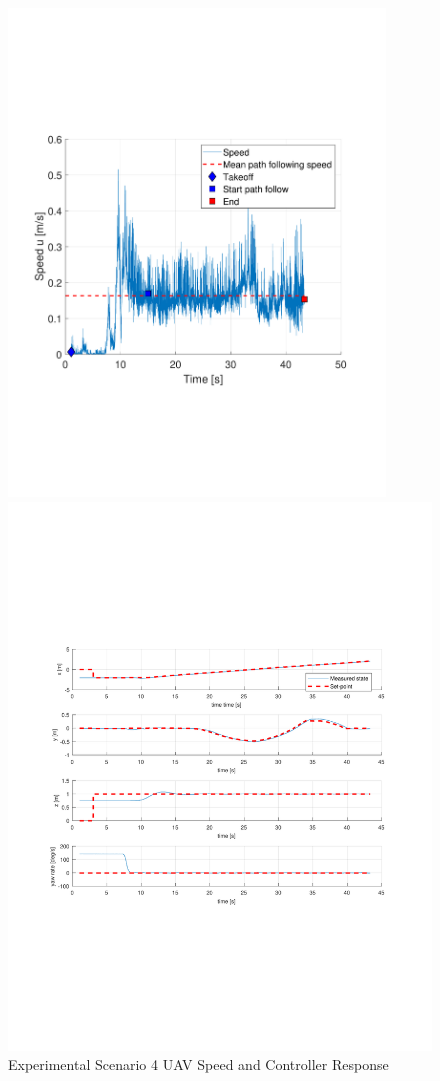\documentclass[numbered,pdftex]{ohio-etd}
\begin{document}
\pagebreak
\begin{figure}[H]
	\centering
	\includegraphics[trim = 0 150 0 200, clip, width=10cm]{Figures/results/compareFigures/4u}
	
	\centering
	\includegraphics[trim = 65 210 0 200, clip, width=16cm]{Figures/results/compareFigures/4Controller}
	\caption{Experimental Scenario 4 UAV Speed and Controller Response}
	\label{fig:4Controller}
\end{figure}



   

\end{document}
